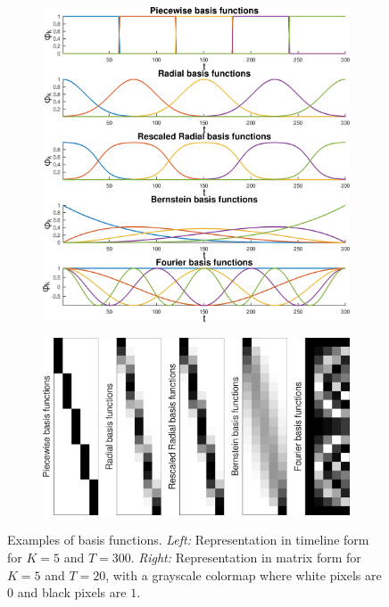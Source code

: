 \documentclass[10pt,a4paper]{article} %
\begin{document}
\begin{figure}
\centering
\begin{subfigure}[c]{.45\textwidth}
	\centering
	\includegraphics[width=\textwidth]{images/MP_basisFcts01.png}
\end{subfigure}
\hfill
\begin{subfigure}[c]{.45\textwidth}
	\centering
	\includegraphics[width=\textwidth]{images/MP_basisFcts_mat01.png}
\end{subfigure}
\caption{\footnotesize
Examples of basis functions. \emph{Left:} Representation in timeline form for $K=5$ and $T=300$. \emph{Right:} Representation in matrix form for $K=5$ and $T=20$, with a grayscale colormap where white pixels are $0$ and black pixels are $1$.
}
\label{fig:MP}
\end{figure}
\end{document}
